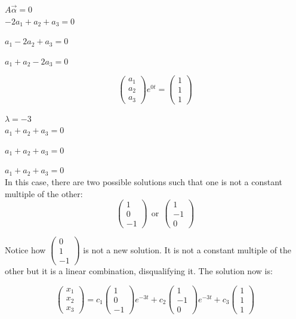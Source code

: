 \documentclass[12pt]{article}
\numberwithin{equation}{subsection}
\newcommand{\indb}{\hspace{1cm}}
\newcommand{\indd}{\hspace{2cm}}
\begin{document}
\indd $A\vec{\alpha}=0$\\

\indb $-2a_1+a_2+a_3=0$

\indb $a_1-2a_2+a_3=0$

\indb $a_1+a_2-2a_3=0$

$$ \begin{pmatrix}
a_1 \\
a_2 \\
a_3
\end{pmatrix}e^{0t}=\begin{pmatrix}
1 \\
1 \\
1
\end{pmatrix} $$

\indd $\lambda=-3$\\

\indb $a_1+a_2+a_3=0$

\indb $a_1+a_2+a_3=0$

\indb $a_1+a_2+a_3=0$\\

In this case, there are two possible solutions such that one is not a constant multiple of the other:
$$ \begin{pmatrix}
1 \\
0 \\
-1 
\end{pmatrix}\ \ \textrm{or}\ \ \begin{pmatrix}
1 \\
-1 \\
0
\end{pmatrix} $$

Notice how $\begin{pmatrix}
0 \\
1 \\
-1
\end{pmatrix} $ is not a new solution. It is not a constant multiple of the other but it is a linear combination, disqualifying it. The solution now is:

$$ \begin{pmatrix}
x_1 \\
x_2 \\
x_3 
\end{pmatrix} = c_1 \begin{pmatrix}
1 \\
0 \\
-1
\end{pmatrix}e^{-3t} + c_2 \begin{pmatrix}
1 \\
-1 \\
0
\end{pmatrix}e^{-3t} + c_3 \begin{pmatrix}
1 \\
1 \\
1
\end{pmatrix} $$
\end{document}
